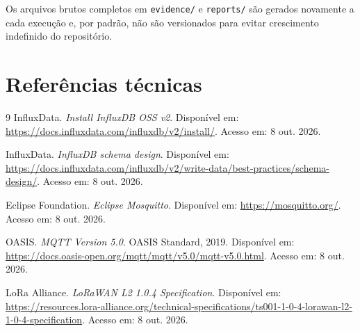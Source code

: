 \documentclass[12pt,a4paper]{article}
\newcommand{\code}[1]{\texttt{#1}}
\begin{document}
Os arquivos brutos completos em \code{evidence/} e \code{reports/} são gerados novamente a cada execução e, por padrão, não são versionados para evitar crescimento indefinido do repositório.

\section{Referências técnicas}

\begin{thebibliography}{9}
InfluxData. \emph{Install InfluxDB OSS v2}. Disponível em: \url{https://docs.influxdata.com/influxdb/v2/install/}. Acesso em: 8 out. 2026.

InfluxData. \emph{InfluxDB schema design}. Disponível em: \url{https://docs.influxdata.com/influxdb/v2/write-data/best-practices/schema-design/}. Acesso em: 8 out. 2026.

Eclipse Foundation. \emph{Eclipse Mosquitto}. Disponível em: \url{https://mosquitto.org/}. Acesso em: 8 out. 2026.

OASIS. \emph{MQTT Version 5.0}. OASIS Standard, 2019. Disponível em: \url{https://docs.oasis-open.org/mqtt/mqtt/v5.0/mqtt-v5.0.html}. Acesso em: 8 out. 2026.

LoRa Alliance. \emph{LoRaWAN L2 1.0.4 Specification}. Disponível em: \url{https://resources.lora-alliance.org/technical-specifications/ts001-1-0-4-lorawan-l2-1-0-4-specification}. Acesso em: 8 out. 2026.
\end{thebibliography}
\end{document}
